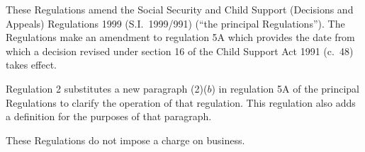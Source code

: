 \documentclass[12pt,a4paper]{article}
\begin{document}
These Regulations amend the Social Security and Child Support (Decisions and Appeals) Regulations 1999 (S.I.\ 1999/991) (“the principal Regulations”). The Regulations make an amendment to regulation 5A which provides the date from which a decision revised under section 16 of the Child Support Act 1991 (c.\ 48) takes effect.

Regulation 2 substitutes a new paragraph (2)($b$)  in regulation 5A of the principal Regulations to clarify the operation of that regulation. This regulation also adds a definition for the purposes of that paragraph.

These Regulations do not impose a charge on business.  
\end{document}
